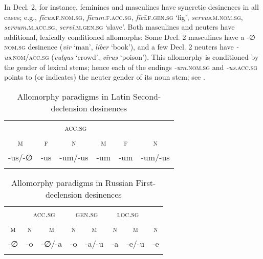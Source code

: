 \documentclass[output=paper, colorlinks,citecolor=brown]{langsci/langscibook}
\begin{document}
\begin{sloppypar}
In Decl. 2, for instance, feminines and masculines have syncretic desinences in all cases; e.g., \textit{fīcus}.\textsc{f.nom.sg}, \textit{fīcum}.\textsc{f.acc.sg}, \textit{fīcī}.\textsc{f.gen.sg} ‘fig', \textit{servus}.\textsc{m.nom.sg}, \textit{servum}.\textsc{m.acc.sg}, \textit{servī}.\textsc{m.gen.sg} ‘slave'. Both masculines and neuters have additional, lexically conditioned allomorphs: Some Decl. 2 masculines have a \mbox{-∅} \textsc{nom.sg} desinence (\textit{vir} `man', \textit{liber} `book'), and a few Decl. 2 neuters have \mbox{\textit{-us}.\textsc{nom}}\slash\textsc{acc.sg} (\textit{vulgus} `crowd', \textit{vīrus} `poison'). This allomorphy is conditioned by the gender of lexical stems; hence each of the endings \textit{-um}.\textsc{nom.sg} and \textit{\mbox{-us}}.\textsc{acc.sg} points to (or indicates) the neuter gender of its noun stem; see .
\end{sloppypar}\largerpage

\begin{table}
\caption{Allomorphy paradigms in Latin Second-declension desinences\label{tab:andersen_4}}
\begin{tabular}{ccc ccc}
\lsptoprule
\multicolumn{3}{c}{\scshape nom.sg} & \multicolumn{3}{c}{\scshape acc.sg}\\\cmidrule(lr){1-3}\cmidrule(lr){4-6}
\scshape m & \scshape f & \scshape n & \scshape m & \scshape f & \scshape n\\\midrule
-us/-∅ & -us  &    -um/-us & -um & -um & -um/-us\\
\lspbottomrule
\end{tabular}
\end{table}

\begin{table}
\caption{Allomorphy paradigms in Russian First-declension desinences\label{tab:andersen_5}}
\begin{tabular}{cc cc cc cc}
\lsptoprule
\multicolumn{2}{c}{\scshape nom.sg}    &  \multicolumn{2}{c}{\scshape acc.sg} &  \multicolumn{2}{c}{\scshape gen.sg} & \multicolumn{2}{c}{\scshape loc.sg}\\\cmidrule(lr){1-2}\cmidrule(lr){3-4}\cmidrule(lr){5-6}\cmidrule(lr){7-8}
\scshape m & \scshape n        &   \scshape m &\scshape n &      \scshape m & \scshape n &  \scshape  m & \scshape n \\\midrule
   -∅      &  -o     &  -∅/-a & -o  & -a/-u & -a & -e/-u & -e\\
\lspbottomrule
\end{tabular}
\end{table}
\end{document}
